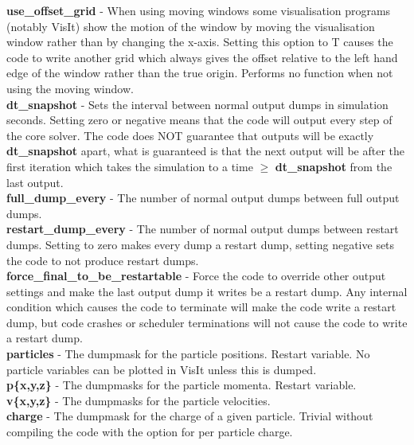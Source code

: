 \documentclass[12pt]{article}
\newcommand{\emphtext}{\color{warwickdark} \fontfamily{phv}\selectfont\Large\bf}
\newcommand{\inlineemph}[1]{{\color{warwicklight} \bf{#1}}}
\begin{document}
{\emphtext use\_offset\_grid} - When using moving windows some visualisation
programs (notably VisIt) show the motion of the window by moving the
visualisation window rather than by changing the x-axis. Setting this option to
T causes the code to write another grid which always gives the offset relative
to the left hand edge of the window rather than the true origin. Performs no
function when not using the moving window.\\

{\emphtext dt\_snapshot} - Sets the interval between normal output dumps in
simulation seconds. Setting zero or negative means that the code will output
every step of the core solver. The code does NOT guarantee that outputs will be
exactly \inlineemph{dt\_snapshot} apart, what is guaranteed is that the next
output will be after the first iteration which takes the simulation to a time
$\ge$ \inlineemph{dt\_snapshot} from the last output.\\

{\emphtext full\_dump\_every} - The number of normal output dumps between full
output dumps.\\

{\emphtext restart\_dump\_every} - The number of normal output dumps between
restart dumps. Setting to zero makes every dump a restart dump, setting
negative sets the code to not produce restart dumps.\\

{\emphtext force\_final\_to\_be\_restartable} - Force the code to override
other output settings and make the last output dump it writes be a restart
dump. Any internal condition which causes the code to terminate will make the
code write a restart dump, but code crashes or scheduler terminations will not
cause the code to write a restart dump.\\

{\emphtext particles} - The dumpmask for the particle positions. Restart
variable. No particle variables can be plotted in VisIt unless this is
dumped.\\

{\emphtext p\{x,y,z\}} - The dumpmasks for the particle momenta. Restart
variable.\\

{\emphtext v\{x,y,z\}} - The dumpmasks for the particle velocities.\\

{\emphtext charge} - The dumpmask for the charge of a given particle. Trivial
without compiling the code with the option for per particle charge.\\
\end{document}

